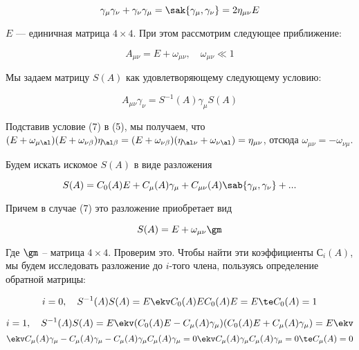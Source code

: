 \documentclass[12pt]{kiarticle}
\begin{document}
\begin{equation}\label{}
\gamma_\mu \gamma_\nu + \gamma_\nu \gamma_\mu =\sak{\gamma_\mu, \gamma_\nu} = 2 \eta_{\mu\nu}E
\end{equation}

$ E $ --- единичная матрица $ 4\times4 $. При этом рассмотрим следующее приближение:

\begin{equation}\label{}
A_{\mu\nu} = E + \omega_{\mu\nu}, \quad \omega_{\mu\nu} \ll 1
\end{equation}

Мы задаем матрицу $ S(A)$ как удовлетворяющему следующему условию: 

\begin{equation}\label{}
A_{\mu\nu}\gamma_\nu = S^{-1}(A)\gamma_\mu S(A)
\end{equation}

Подставив условие (7) в (5), мы получаем, что  $ (E +  \omega_{\mu\al})(E + \omega_{\nu\beta}) \eta_{\al\beta} = (E + \omega_{\nu\beta})(\eta_{\al\nu} +  \omega_{\nu\al}) = \eta_{\mu\nu}  $, отсюда $ \omega_{\mu\nu} = -\omega_{\nu\mu} $. 

Будем искать искомое $ S(A) $ в виде разложения

\begin{equation}\label{}
S(A) = C_0(A)E + C_\mu (A) \gamma_\mu + C_{\mu\nu}(A)\sab{\gamma_\mu,\gamma_\nu} + ...
\end{equation}

Причем в случае (7) это разложение приобретает вид 

\begin{equation}\label{}
S(A) = E + \omega_{\mu\nu}\gm
\end{equation}

Где $ \gm $ -- матрица $ 4 \times 4 $. Проверим это. Чтобы найти эти коэффициенты $ С_i(A) $, мы будем исследовать разложение до $ i $-того члена, пользуясь определение обратной матрицы:

\begin{equation}\label{}
i = 0, \quad S^{-1}(A)S(A) = E \ekv C_0(A)EC_0(A)E = E \te C_0(A) = 1
\end{equation}

\begin{equation*}\label{}
i = 1, \quad S^{-1}(A)S(A) = E \ekv (C_0(A)E- C_\mu (A) \gamma_\mu)(C_0(A)E + C_\mu (A) \gamma_\mu) = E \ekv
\end{equation*}
\begin{equation}\label{}
\ekv C_\mu (A) \gamma_\mu - C_\mu (A) \gamma_\mu - C_\mu (A) \gamma_\mu C_\mu (A) \gamma_\mu = 0 \ekv C_\mu (A) \gamma_\mu C_\mu (A) \gamma_\mu = 0 \te C_\mu (A) = 0 
\end{equation}
\end{document}
